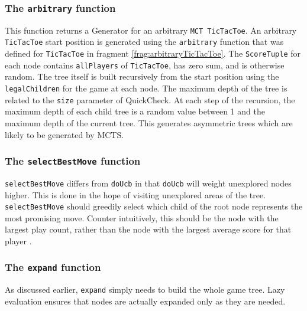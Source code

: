 \subsubsection{The \texttt{arbitrary} function}
This function returns a {Generator} for an arbitrary \texttt{MCT TicTacToe}. An arbitrary \texttt{TicTacToe} start position is generated using the \texttt{arbitrary} function that was defined for \texttt{TicTacToe} in fragment \ref{frag:arbitraryTicTacToe}.  The \texttt{ScoreTuple} for each node contains \texttt{allPlayers} of \texttt{TicTacToe}, has zero sum, and is otherwise random. The tree itself is built recursively from the start position using the \texttt{legalChildren} for the game at each node. The maximum depth of the tree is related to the \texttt{size} parameter of {QuickCheck}. At each step of the recursion, the maximum depth of each child tree is a random value between 1 and the maximum depth of the current tree. This generates asymmetric trees which are likely to be generated by {MCTS}.

\subsubsection{The \texttt{selectBestMove} function}
\texttt{selectBestMove} differs from \verb|doUcb| in that \verb|doUcb| will weight unexplored nodes higher. This is done in the hope of visiting unexplored areas of the tree. \texttt{selectBestMove} should greedily select which child of the root node represents the most promising move. Counter intuitively, this should be the node with the largest play count, rather than the node with the largest average score for that player \cite{firstmcts}.

\subsubsection{The \texttt{expand} function}
As discussed earlier, \texttt{expand} simply needs to build the whole game tree. Lazy evaluation ensures that nodes are actually expanded only as they are needed.


